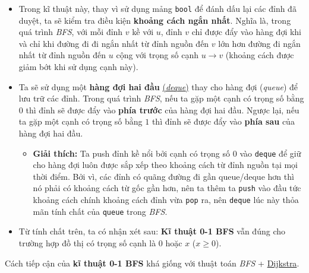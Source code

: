 \documentclass{article}
\begin{document}
\begin{itemize}
    \item Trong kĩ thuật này, thay vì sử dụng mảng \texttt{bool} để đánh dấu lại các đỉnh đã duyệt, ta sẽ kiểm tra điều kiện \textbf{khoảng cách ngắn nhất}. Nghĩa là, trong quá trình \textit{BFS}, với mỗi đỉnh $v$ kề với $u$, đỉnh $v$ chỉ được đẩy vào hàng đợi khi và chỉ khi đường đi đi ngắn nhất từ đỉnh nguồn đến $v$ lớn hơn đường đi ngắn nhất từ đỉnh nguồn đến $u$ cộng với trọng số cạnh $u \rightarrow v$ (khoảng cách được giảm bớt khi sử dụng cạnh này).
    \item Ta sẽ sử dụng một \textbf{hàng đợi hai đầu} \href{https://wiki.vnoi.info/algo/data-structures/Deque}{(\textit{deque})} thay cho hàng đợi (\textit{queue}) để lưu trữ các đỉnh. Trong quá trình \textit{BFS}, nếu ta gặp một cạnh có trọng số bằng $0$ thì đỉnh sẽ được đẩy vào \textbf{phía trước} của hàng đợi hai đầu. Ngược lại, nếu ta gặp một cạnh có trọng số bằng $1$ thì đỉnh sẽ được đẩy vào \textbf{phía sau} của hàng đợi hai đầu.
    \begin{itemize}
        \item \textbf{Giải thích:} Ta push đỉnh kề nổi bởi cạnh có trọng số $0$ vào \texttt{deque} để giữ cho hàng đợi luôn được sắp xếp theo khoảng cách từ đỉnh nguồn tại mọi thời điểm. Bởi vì, các đỉnh có quãng đường đi gần queue/deque hơn thì nó phải có khoảng cách từ gốc gần hơn, nên ta thêm ta \texttt{push} vào đầu tức khoảng cách chính khoảng cách đỉnh vừa \texttt{pop} ra, nên \texttt{deque} lúc này thỏa mãn tính chất của \texttt{queue} trong \textit{BFS}.
    \end{itemize}
    \item Từ tính chất trên, ta có nhận xét sau: \textbf{Kĩ thuật 0-1 BFS} vẫn đúng cho trường hợp đồ thị có trọng số cạnh là $0$ hoặc $x$ ($x \geq 0$).
\end{itemize}

Cách tiếp cận của \textbf{kĩ thuật 0-1 BFS} khá giống với thuật toán \textit{BFS} + \href{https://en.wikipedia.org/wiki/Dijkstra%27s_algorithm}{Dijkstra}.
\end{document}
